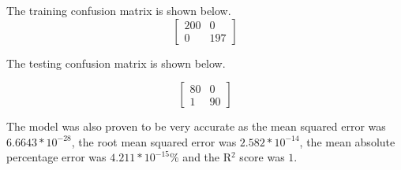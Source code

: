 \documentclass[conference]{IEEEtran}
\begin{document}
The training confusion matrix is shown below.
\begin{equation}
\begin{bmatrix}
200 & 0 \\
0 & 197
\end{bmatrix}
\end{equation}


The testing confusion matrix is shown below.

\begin{equation}
\begin{bmatrix}
80 & 0 \\
1 & 90
\end{bmatrix}
\end{equation}

The model was also proven to be very accurate as the mean squared error was \(6.6643 * 10^{-28}\), the root mean squared error was \(2.582 * 10^{-14}\), the
mean absolute percentage error was \(4.211 * 10^{-15} \%\) and the R\(^{2}\)
score was \(1\).
\end{document}
